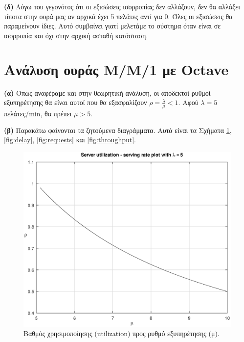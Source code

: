 \documentclass {article}
\begin{document}
\textbf{(δ)} Λόγω του γεγονότος ότι οι εξισώσεις ισορροπίας δεν αλλάζουν, δεν θα αλλάξει τίποτα στην ουρά μας αν αρχικά έχει 5 πελάτες αντί για 0. Όλες οι εξισώσεις θα παραμείνουν ίδιες. Αυτό συμβαίνει γιατί μελετάμε το σύστημα όταν είναι σε ισορροπία και όχι στην αρχική ασταθή κατάσταση.

\section*{Ανάλυση ουράς Μ/Μ/1 με \foreignlanguage{english}{Octave}}

\textbf{(α)} Όπως αναφέραμε και στην θεωρητική ανάλυση, οι αποδεκτοί ρυθμοί εξυπηρέτησης θα είναι αυτοί που θα εξασφαλίζουν $ρ = \frac{λ}{μ} < 1$. Αφού $λ = 5$ πελάτες/\foreignlanguage{english}{min}, θα πρέπει $μ > 5$.

\textbf{(β)} Παρακάτω φαίνονται τα ζητούμενα διαγράμματα. Αυτά είναι τα Σχήματα \ref{fig:util}, \ref{fig:delay}, \ref{fig:requests} και \ref{fig:throughput}.

\begin{figure}[ht]
	\includegraphics[width=\linewidth]{M-M-1_Util_SrvRate}
	\caption{Βαθμός χρησιμοποίησης \foreignlanguage{english}{(utilization)} προς ρυθμό εξυπηρέτησης (μ).}
	\label{fig:util}
\end{figure}
\end{document}
